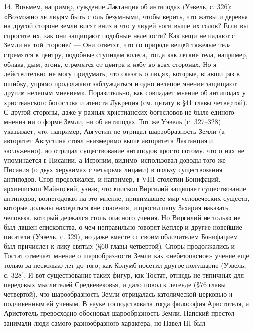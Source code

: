 14.  Возьмем, например,  суждение Лактанция  об антиподах  (Уэвель, с.
326): «Возможно ли людям быть столь безумными, чтобы верить, что жатвы
и деревья на другой  стороне земли висят вниз и что  у людей ноги выше
их голов?  Если вы спросите  их, как они защищают  подобные нелепости?
Как вещи  не падают с  Земли на той стороне?  --- Они ответят,  что по
природе  вещей  тяжелые тела  стремятся  к  центру, подобные  ступицам
колеса, тогда как легкие тела, например, облака, дым, огонь, стремятся
от  центра  к небу  во  всех  сторонах.  Но  я действительно  не  могу
придумать,  что  сказать  о  людях,  которые,  впавши  раз  в  ошибку,
упрямо продолжают  заблуждаться и одно нелепое  мнение защищают другим
нелепым мнением».  Поразительно, как  совпадает мнение об  антиподах у
христианского богослова  и атеиста  Лукреция (см.  цитату в  §41 главы
четвертой). С другой стороны, даже у разных христианских богословов не
было  единого  мнения ни  о  форме  Земли,  ни  об антиподах.  Тот  же
Уэвель  (с. 327--328)  указывает, что,  например, Августин  не отрицал
шарообразность  Земли (а  авторитет  Августина  стоял неизмеримо  выше
авторитета Лактанция и заслуженно), но отрицал существование антиподов
просто  потому,  что  о  них  не упоминается  в  Писании,  а  Иероним,
видимо,  использовал  доводы  того  же Писания  (о  двух  херувимах  с
четырьмя лицами) в пользу существования антиподов. Спор продолжался, и
например, в VIII столетии Бонифаций, архиепископ Майнцский, узнав, что
епископ  Виргилий защищает  существование  антиподов, вознегодовал  на
это  мнение,  принимавшее  мир человеческих  существ,  которые  должны
находиться  вне спасения,  и  просил папу  Захария наказать  человека,
который держался столь  опасного учения. Но Виргилий не  только не был
лишен епископства, о чем неправильно  говорят Кеплер и другие новейшие
писатели  (Уэвель,  с.  329),  но даже  вместе  со  своим  обличителем
Бонифацием был  причислен к лику  святых (§60 главы  четвертой). Споры
продолжались  и  Тостат отмечает  мнение  о  шарообразности Земли  как
«небезопасное» учение еще только за  несколько лет до того, как Колумб
посетил другое полушарие  (Уэвель, с. 328). И  вот существование таких
фигур,  как  Тостат,  отнюдь  не  типичных  для  передовых  мыслителей
Средневековья,  и дало  повод  к легенде  (§76  главы четвертой),  что
шарообразность  Земли отрицалась  католической церковью  и подчиненным
ей  ученым.  В  науке  господствовала тогда  философия  Аристотеля,  а
Аристотель превосходно обосновал шарообразность Земли. Папский престол
занимали  люди  самого  разнообразного  характера, но  Павел  III  был
